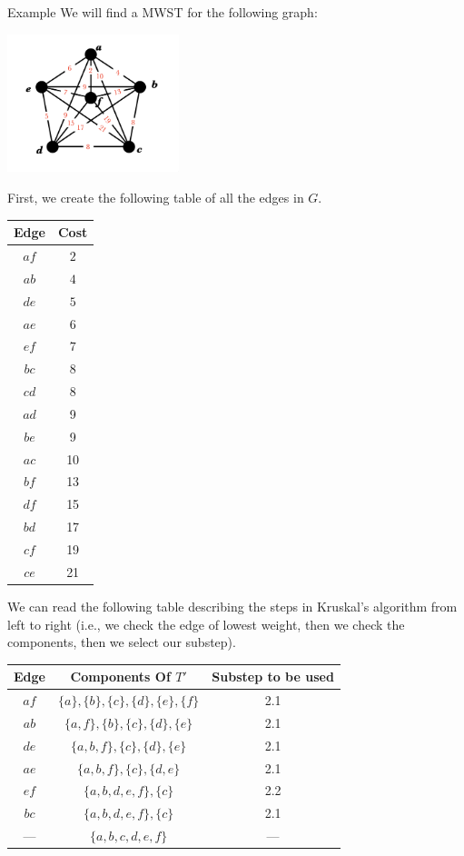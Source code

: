 \documentclass[10pt]{extarticle}
\begin{document}
  \begin{problem}{Example}
    We will find a MWST for the following graph:
    \begin{center}
      \includegraphics[width=5cm]{MWST_Example}
    \end{center}
    First, we create the following table of all the edges in $G$.
    \begin{center}
      \small
      \begin{tabular}{c|c}
        Edge & Cost \\
        \hline
        $af$ & $2$ \\
        $ab$ & $4$ \\
        $de$ & $5$ \\
        $ae$ & $6$ \\
        $ef$ & $7$ \\
        $bc$ & $8$ \\
        $cd$ & 8 \\
        $ad$ & 9\\
        $be$ & 9 \\
        $ac$ & 10 \\
        $bf$ & 13 \\
        $df$ & 15 \\
        $bd$ & 17 \\
        $cf$ & 19 \\
        $ce$ & 21
      \end{tabular}
    \end{center}
    We can read the following table describing the steps in Kruskal's algorithm from left to right (i.e., we check the edge of lowest weight, then we check the components, then we select our substep).
    \begin{center}
      \begin{tabular}{c|c|c}
        Edge & Components Of $T'$& Substep to be used\\
        \hline
        $af$ & $\{a\},\{b\},\{c\},\{d\},\{e\},\{f\}$ & 2.1 \\
        $ab$ & $\{a,f\},\{b\},\{c\},\{d\},\{e\}$ & 2.1 \\
        $de$ & $\{a,b,f\},\{c\},\{d\},\{e\}$ & 2.1 \\
        $ae$ & $\{a,b,f\},\{c\},\{d,e\}$ & 2.1 \\
        $ef$ & $\{a,b,d,e,f\},\{c\}$ & 2.2 \\
        $bc$ & $\{a,b,d,e,f\},\{c\}$ & 2.1 \\
        --- & $\{a,b,c,d,e,f\}$ & ---
      \end{tabular}
    \end{center}
  \end{problem}
\end{document}

